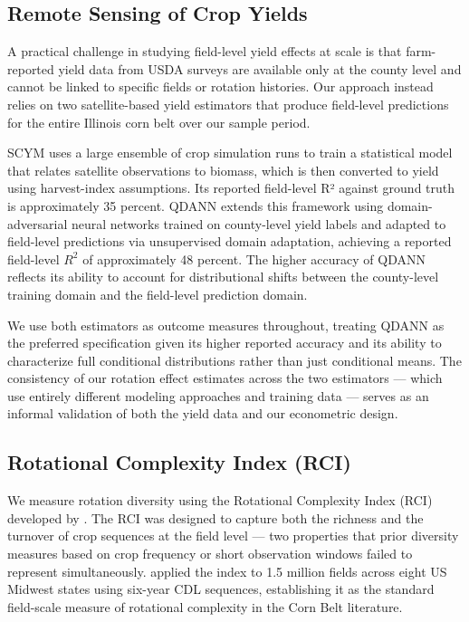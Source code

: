 \documentclass[11pt,letterpaper]{article}
\theoremstyle{remark}
\theoremstyle{plain}
\theoremstyle{definition}
\begin{document}
\subsection{\label{subsec:remote_sensing}Remote Sensing of Crop Yields}

A practical challenge in studying field-level yield effects at scale is that farm-reported yield data from USDA surveys are available only at the county level and cannot be linked to specific fields or rotation histories. Our approach instead relies on two satellite-based yield estimators that produce field-level predictions for the entire Illinois corn belt over our sample period.

SCYM \citep{lobell2015} uses a large ensemble of crop simulation runs to train a statistical model that relates satellite observations to biomass, which is then converted to yield using harvest-index assumptions. Its reported field-level R² against ground truth is approximately 35 percent. QDANN \citep{Ma2024} extends this framework using domain-adversarial neural networks trained on county-level yield labels and adapted to field-level predictions via unsupervised domain adaptation, achieving a reported field-level $R^{2}$ of approximately 48 percent. The higher accuracy of QDANN reflects its ability to account for distributional shifts between the county-level training domain and the field-level prediction domain.

We use both estimators as outcome measures throughout, treating QDANN as the preferred specification given its higher reported accuracy and its ability to characterize full conditional distributions rather than just conditional means. The consistency of our rotation effect estimates across the two estimators — which use entirely different modeling approaches and training data — serves as an informal validation of both the yield data and our econometric design.
    
\subsection{\label{subsec:rci}Rotational Complexity Index (RCI)}	
We measure rotation diversity using the Rotational Complexity Index (RCI) developed by \cite{socolar2021}. The RCI was designed to capture both the richness and the turnover of crop sequences at the field level — two properties that prior diversity measures based on crop frequency or short observation windows failed to represent simultaneously. \cite{socolar2021} applied the index to 1.5 million fields across eight US Midwest states using six-year CDL sequences, establishing it as the standard field-scale measure of rotational complexity in the Corn Belt literature.
\end{document}
